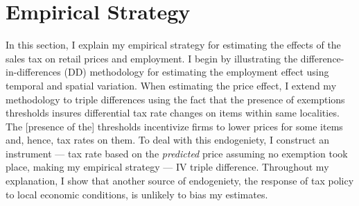 \documentclass[12pt]{article}
\begin{document}
		

				 
				 
		

	
	\section{Empirical Strategy}
	\label{sec:empstr}
	
	
	In this section, I explain my empirical strategy for estimating the effects of the sales tax on retail prices and employment. I begin by illustrating the difference-in-differences (DD) methodology for estimating the  employment effect using temporal and spatial variation. When estimating the price effect, I extend my methodology to triple differences using the fact that the presence of exemptions thresholds insures differential tax rate changes on items within same localities. The [presence of the] thresholds incentivize firms to lower prices for some items and, hence, tax rates on them. To deal with this endogeniety, I construct an instrument --- tax rate based on the \emph{predicted} price assuming no exemption took place, making my empirical strategy --- IV triple difference. Throughout my explanation, I show that another source of endogeniety, the response of tax policy to local economic conditions, is unlikely to bias my estimates.
	
\end{document}

